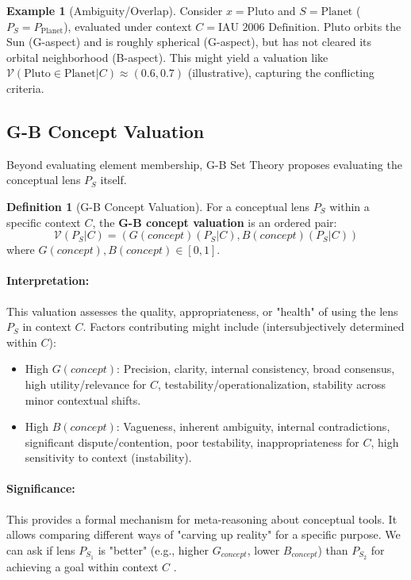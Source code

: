 \documentclass[11pt]{article}
\newcommand{\gbval}[1]{\mathcal{V}(#1)}         %
\newcommand{\gcomp}[1]{G(#1)}                   %
\newcommand{\bcomp}[1]{B(#1)}                   %
\newcommand{\pset}[1]{P_{#1}}                   %
\theoremstyle{definition}
\newtheorem{definition}{Definition}[section]
\newtheorem{example}{Example}[section]
\theoremstyle{plain}
\begin{document}
\begin{example}[Ambiguity/Overlap]
Consider $x = \text{Pluto}$ and $S = \text{Planet}$ ($\pset{S} = P_{\text{Planet}}$), evaluated under context $C = \text{IAU 2006 Definition}$. Pluto orbits the Sun (G-aspect) and is roughly spherical (G-aspect), but has not cleared its orbital neighborhood (B-aspect). This might yield a valuation like $\gbval{\text{Pluto} \in \text{Planet} | C} \approx (0.6, 0.7)$ (illustrative), capturing the conflicting criteria.
\end{example}

\subsection{G-B Concept Valuation}
Beyond evaluating element membership, G-B Set Theory proposes evaluating the conceptual lens $\pset{S}$ itself.

\begin{definition}[G-B Concept Valuation] \label{def:gb_concept_val}
For a conceptual lens $\pset{S}$ within a specific context $C$, the \textbf{G-B concept valuation} is an ordered pair:
$$ \gbval{\pset{S}|C} = (\gcomp{concept}(\pset{S}|C), \bcomp{concept}(\pset{S}|C)) $$
where $\gcomp{concept}, \bcomp{concept} \in [0, 1]$.
\end{definition}

\paragraph{Interpretation:} This valuation assesses the quality, appropriateness, or "health" of using the lens $\pset{S}$ in context $C$. Factors contributing might include (intersubjectively determined within $C$):
\begin{itemize}
    \item High $\gcomp{concept}$: Precision, clarity, internal consistency, broad consensus, high utility/relevance for $C$, testability/operationalization, stability across minor contextual shifts.
    \item High $\bcomp{concept}$: Vagueness, inherent ambiguity, internal contradictions, significant dispute/contention, poor testability, inappropriateness for $C$, high sensitivity to context (instability).
\end{itemize}

\paragraph{Significance:} This provides a formal mechanism for meta-reasoning about conceptual tools. It allows comparing different ways of "carving up reality" for a specific purpose. We can ask if lens $\pset{S_1}$ is "better" (e.g., higher $G_{concept}$, lower $B_{concept}$) than $\pset{S_2}$ for achieving a goal within context $C$ \cite{gb_set_theory_outline}.
\end{document}
